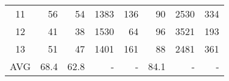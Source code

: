 \begin{table}
{{\begin{tabular}{c|r|r||r|r|r||r|r}
11 & 56 & 54 & 1383 & 136 & 90 & 2530 & 334 \\ 

12 & 41 & 38 & 1530 & 64 & 96 & 3521 & 193 \\ 

13 & 51 & 47 & 1401 & 161 & 88 & 2481 & 361 \\ \hline

AVG& 68.4 & 62.8 & - & - & 84.1 & - & - \\  \hline
          
\hline\end{tabular}\centering
            }
}
\vspace{-0.18in}
\end{table}


%       
%
%
%
%
%
%
%
%
